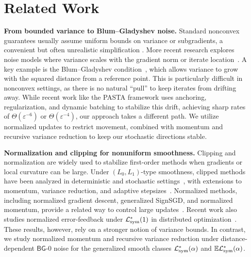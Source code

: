\documentclass[letter,11pt]{article}
\newcommand{\E}{\mathbb{E}}
\newcommand{\Lcal}{\mathcal{L}}
\begin{document}
\section{Related Work}
\label{sec:rel_work}
\textbf{From bounded variance to Blum--Gladyshev noise.}
Standard nonconvex guarantees usually assume uniform bounds on variance or subgradients, a convenient but often unrealistic simplification \cite{ghadimi2013stochastic, nemirovski2009robust, bottou2018optimization,moulines2011non, rakhlin2012making, shamir2013stochastic,bottou2018optimization, jain2018parallelizing}. More recent research explores noise models where variance scales with the gradient norm or iterate location~\cite{gorbunov2020unified,khaled2022better,khaled2023unified,ilandarideva2023accelerated,grimmer2019convergence,alacaoglu2025towards}. A key example is the Blum–Gladyshev condition~\cite{blum1954approximation,gladyshev1965stochastic}, which allows variance to grow with the squared distance from a reference point. This is particularly difficult in nonconvex settings, as there is no natural ``pull'' to keep iterates from drifting away. While recent work like the PASTA framework \cite{fazla2026lower} uses anchoring, regularization, and dynamic batching to stabilize this drift, achieving sharp rates of $\Theta(\varepsilon^{-6})$ or $\Theta(\varepsilon^{-4})$, our approach takes a different path. We utilize normalized updates to restrict movement, combined with momentum and recursive variance reduction to keep our stochastic directions stable.


\textbf{Normalization and clipping for nonuniform smoothness.} Clipping and normalization are widely used to stabilize first-order methods when gradients or local curvature can be large. Under $(L_0, L_1)$-type smoothness, clipped methods have been analyzed in deterministic and stochastic settings~\cite{zhang2019gradient,koloskova2023revisiting}, with extensions to momentum, variance reduction, and adaptive stepsizes~\cite{zhang2020improved,reisizadeh2025variance,wang2024provable,li2023convergence,takezawa2024parameter}. Normalized methods, including normalized gradient descent, generalized SignSGD, and normalized momentum, provide a related way to control large updates~\cite{zhao2021convergence,hubler2024parameter,crawshaw2022robustness}. Recent work also studies normalized error-feedback under $\Lcal^*_{\rm sym}(1)$ in distributed optimization~\cite{khirirat2026error}. These results, however, rely on a stronger notion of variance bounds. In contrast, we study normalized momentum and recursive variance reduction under distance-dependent $\mathsf{BG}$-0 noise for the generalized smooth classes $\Lcal^*_{\rm sym}(\alpha)$ and $\E\Lcal^*_{\rm sym}(\alpha)$.
\end{document}
